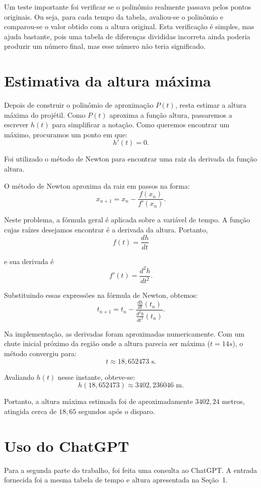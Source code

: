 \documentclass[12pt,brazil,a4paper, twocolumn]{article}
\begin{document}
Um teste importante foi verificar se o polinômio realmente passava pelos pontos originais. Ou seja, para cada tempo da tabela, avaliou-se o polinômio e comparou-se o valor obtido com a altura original. Esta verificação é simples, mas ajuda bastante, pois uma tabela de diferenças divididas incorreta ainda poderia produzir um número final, mas esse número não teria significado.

\section{Estimativa da altura máxima}

Depois de construir o polinômio de aproximação $P(t)$, resta estimar a altura máxima do projétil. Como $P(t)$ aproxima a função altura, passaremos a escrever $h(t)$ para simplificar a notação. Como queremos encontrar um máximo, procuramos um ponto em que:
\[
h'(t)=0.
\]

Foi utilizado o método de Newton para encontrar uma raiz da derivada da função altura.

O método de Newton aproxima da raiz em passos na forma:
\[
x_{n+1}=x_n-\frac{f(x_n)}{f'(x_n)}.
\]

Neste problema, a fórmula geral é aplicada sobre a variável de tempo. A função cujas raízes desejamos encontrar é a derivada da altura. Portanto,
\[
f(t)=\frac{dh}{dt}
\]

 e sua derivada é
\[
f'(t)=\frac{d^2h}{dt^2}.
\]

Substituindo essas expressões na fórmula de Newton, obtemos:
\[
t_{n+1}=t_n-\frac{\frac{dh}{dt}(t_n)}{\frac{d^2h}{dt^2}(t_n)}.
\]

Na implementação, as derivadas foram aproximadas numericamente. Com um chute inicial próximo da região onde a altura parecia ser máxima ($t=14s$), o método convergiu para:
\[
t \approx 18,652473 \text{ s}.
\]

Avaliando $h(t)$ nesse instante, obteve-se:
\[
h(18,652473) \approx 3402,236046 \text{ m}.
\]

Portanto, a altura máxima estimada foi de aproximadamente $3402,24$ metros, atingida cerca de $18,65$ segundos após o disparo.

\section{Uso do ChatGPT}

Para a segunda parte do trabalho, foi feita uma consulta ao ChatGPT. A entrada fornecida foi a mesma tabela de tempo e altura apresentada na Seção~1.
\end{document}

